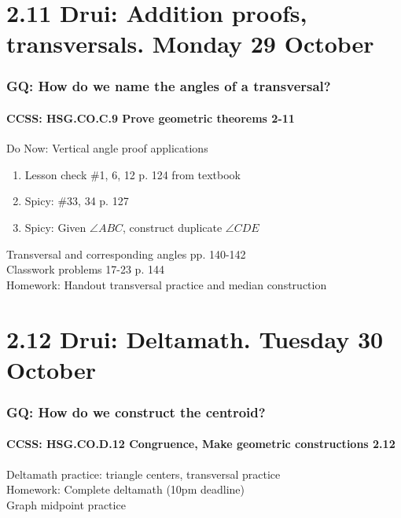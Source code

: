 \documentclass{beamer}
\begin{document}
\section{2.11 Drui: Addition proofs, transversals. Monday 29 October}
  \frame
  {
    \frametitle{GQ: How do we name the angles of a transversal?}
    \framesubtitle{CCSS: HSG.CO.C.9 Prove geometric theorems  \alert{2-11}}

    \begin{block}{Do Now: Vertical angle proof applications}
    \begin{enumerate}
        \item Lesson check \#1, 6, 12 p. 124 from textbook
        \item Spicy: \#33, 34 p. 127
        \item Spicy: Given $\angle ABC$, construct duplicate $\angle CDE$
        \begin{center}
        \end{center}
    \end{enumerate}
    \end{block}
    Transversal and corresponding angles pp. 140-142\\
    Classwork problems 17-23 p. 144\\
    \vspace{0.15cm}
    Homework: Handout transversal practice and median construction
  }

\section{2.12 Drui: Deltamath. Tuesday 30 October}
  \frame
  {
    \frametitle{GQ: How do we construct the centroid?}
    \framesubtitle{CCSS: HSG.CO.D.12 Congruence, Make geometric constructions  \alert{2.12}}

    Deltamath practice: triangle centers, transversal practice\\ \bigskip
    Homework: Complete deltamath (10pm deadline)\\
    Graph midpoint practice
  }
\end{document}
